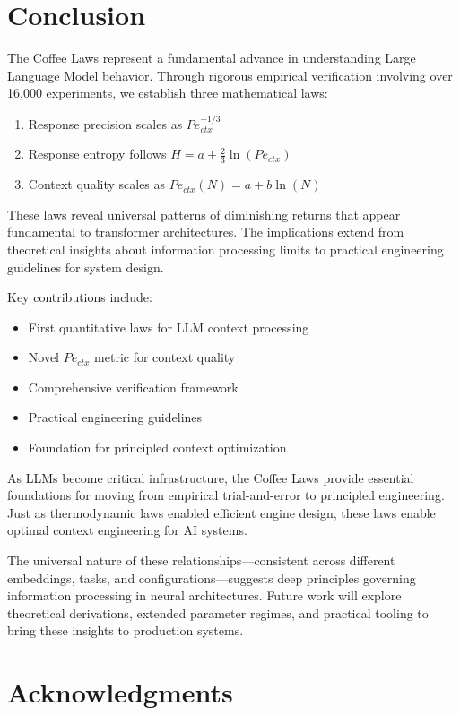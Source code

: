\documentclass[conference]{IEEEtran}
\begin{document}
\section{Conclusion}

The Coffee Laws represent a fundamental advance in understanding Large Language Model behavior. Through rigorous empirical verification involving over 16,000 experiments, we establish three mathematical laws:

\begin{enumerate}
\item Response precision scales as $Pe_{ctx}^{-1/3}$
\item Response entropy follows $H = a + \frac{2}{3}\ln(Pe_{ctx})$
\item Context quality scales as $Pe_{ctx}(N) = a + b\ln(N)$
\end{enumerate}

These laws reveal universal patterns of diminishing returns that appear fundamental to transformer architectures. The implications extend from theoretical insights about information processing limits to practical engineering guidelines for system design.

Key contributions include:
\begin{itemize}
\item First quantitative laws for LLM context processing
\item Novel $Pe_{ctx}$ metric for context quality
\item Comprehensive verification framework
\item Practical engineering guidelines
\item Foundation for principled context optimization
\end{itemize}

As LLMs become critical infrastructure, the Coffee Laws provide essential foundations for moving from empirical trial-and-error to principled engineering. Just as thermodynamic laws enabled efficient engine design, these laws enable optimal context engineering for AI systems.

The universal nature of these relationships—consistent across different embeddings, tasks, and configurations—suggests deep principles governing information processing in neural architectures. Future work will explore theoretical derivations, extended parameter regimes, and practical tooling to bring these insights to production systems.

\section*{Acknowledgments}
\end{document}
